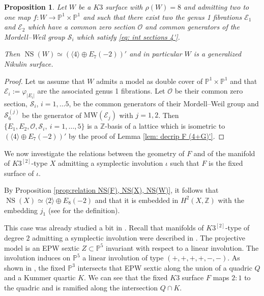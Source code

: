 \documentclass{amsart}
\newtheorem{prop}[thm]{Proposition}
\theoremstyle{definition}
\numberwithin{equation}{section}
\numberwithin{equation}{section} \theoremstyle{definition}
\DeclareMathOperator{\NS}{NS}
\newcommand\PP{{\mathbb{P}}}
\newcommand{\ra}{\rightarrow}
\newcommand\Z{\mathbb{Z}}
\begin{document}
\begin{prop}\label{prop: vice versa <4>+G'}
Let $W$ be a $K3$ surface with $\rho(W)=8$ and admitting two to one map $f:W\ra \mathbb{P}^1\times \mathbb{P}^1$ and such that there exist two  the genus 1 fibrations $\mathcal{E}_1$ and $\mathcal{E}_2$ which have a common zero section $\mathcal{O}$ and common generators of the Mordell--Weil group $\mathcal{S}_i$ which satisfy \eqref{eq: int sections 4'}. 
 
 Then $\NS(W)\simeq (\langle 4 \rangle\oplus E_7(-2))'$ and in particular $W$ is a generalized Nikulin surface.\end{prop}
\begin{proof}
Let us assume that $W$ admits a model as double cover of $\mathbb{P}^1\times \mathbb{P}^1$ and that $\mathcal{E}_i:=\varphi_{|E_i|}$ are the associated genus 1 fibrations. Let $\mathcal{O}$ be their common zero section, $\mathcal{S}_i$, $i=1,\ldots 5$, be the common generators of their Mordell--Weil group and $\mathcal{S}_6^{(j)}$ be the generator of $\mathrm{MW}(\mathcal{E}_j)$ with $j=1,2$. Then $\{E_1,E_2,\mathcal{O},\mathcal{S}_i,\ i=1,\ldots, 5\}$ is a $\Z$-basis of a lattice which is isometric to $(\langle 4\rangle\oplus E_7(-2))'$ by the proof of Lemma \ref{lem: decrip F (4+G)'}. 
\end{proof}

We now investigate the relations between the geometry of $F$ and of the manifold of $K3^{[2]}$-type $X$ admitting a symplectic involution $\iota$ such that $F$ is the fixed surface of $\iota$.

By Proposition \ref{prop:relation NS(F), NS(X), NS(W)}, it follows that $\NS(X)\simeq \langle 2 \rangle \oplus E_8(-2)$ and that it is embedded in $H^2(X,\Z)$ with the embedding $j_1$ (see \cite[Table 3]{CGKK} for the definition).

This case was already studied a bit in \cite[Section 4]{CGKK}.
Recall that manifolds of $K3^{[2]}$-type of degree $2$ admitting a symplectic involution were described  in \cite{C}. 
The projective model is an EPW sextic $Z\subset \PP^5$  invariant with respect to a linear involution. The involution induces on $\PP^5$ a linear involution of type  $(+,+,+,+,-,-)$.
As shown in \cite[Section 4]{CGKK}, the fixed $\PP^3$ intersects that EPW sextic along the union of a quadric $Q$ and a Kummer quartic $K$.
We can see that the fixed $K3$ surface $F$ maps $2:1$ to the quadric and is ramified along the intersection  $Q\cap K$.
\end{document}
